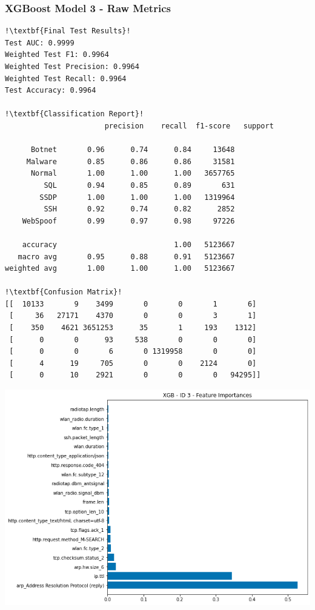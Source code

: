 \begin{appendices}
\subsubsection{XGBoost Model 3 - Raw Metrics}
\begin{lstlisting}[escapechar=!]
!\textbf{Final Test Results}!
Test AUC: 0.9999
Weighted Test F1: 0.9964
Weighted Test Precision: 0.9964
Weighted Test Recall: 0.9964
Test Accuracy: 0.9964

!\textbf{Classification Report}!
			           precision    recall  f1-score   support

      Botnet       0.96      0.74      0.84     13648
     Malware       0.85      0.86      0.86     31581
      Normal       1.00      1.00      1.00   3657765
         SQL       0.94      0.85      0.89       631
        SSDP       1.00      1.00      1.00   1319964
         SSH       0.92      0.74      0.82      2852
    WebSpoof       0.99      0.97      0.98     97226

    accuracy                           1.00   5123667
   macro avg       0.95      0.88      0.91   5123667
weighted avg       1.00      1.00      1.00   5123667
    
!\textbf{Confusion Matrix}!    
[[  10133       9    3499       0       0       1       6]
 [     36   27171    4370       0       0       3       1]
 [    350    4621 3651253      35       1     193    1312]
 [      0       0      93     538       0       0       0]
 [      0       0       6       0 1319958       0       0]
 [      4      19     705       0       0    2124       0]
 [      0      10    2921       0       0       0   94295]]

\end{lstlisting}
\begin{center}
	\centering
	\includegraphics[width=\textwidth]{Appendices/Images/XGB/Model3/XGB_Model3_FI.png}
\end{center}



\end{appendices}
